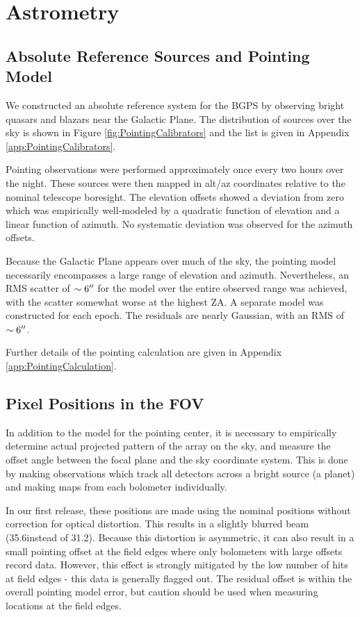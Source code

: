 \documentclass[12pt,preprint]{aastex}
\begin{document}
\section{Astrometry}
\label{sec:Astrometry}

\subsection{Absolute Reference Sources and Pointing Model}

We constructed an absolute reference system for the BGPS by observing
bright quasars and blazars near the Galactic Plane.  The distribution
of sources over the sky is shown in Figure
\ref{fig:PointingCalibrators} and the list is given in Appendix
\ref{app:PointingCalibrators}.

Pointing observations were performed approximately once every two
hours over the night.  These sources were then mapped in alt/az
coordinates relative to the nominal telescope boresight.  The
elevation offsets showed a deviation from zero which was empirically
well-modeled by a quadratic function of elevation and a linear
function of azimuth.  No systematic deviation was observed for the
azimuth offsets.  

Because the Galactic Plane appears over much of the sky, the pointing
model necessarily encompasses a large range of elevation and azimuth.
Nevertheless, an RMS scatter of $\sim 6\mbox{$^{\prime\prime}$}$ for the model over the
entire observed range was achieved, with the scatter somewhat worse at
the highest ZA.  A separate model was constructed for each epoch.  The
residuals are nearly Gaussian, with an RMS of $\sim6\mbox{$^{\prime\prime}$}$.  

Further details of the pointing calculation are given in Appendix
\ref{app:PointingCalculation}.

\subsection{Pixel Positions in the FOV}

In addition to the model for the pointing center, it is necessary to
empirically determine actual projected pattern of the array on the
sky, and measure the offset angle between the focal plane and the sky
coordinate system.  This is done by making observations which track
all detectors across a bright source (a planet) and making maps from each
bolometer individually. 

In our first release, these positions are made using the nominal positions
without correction for optical distortion.  This results in a slightly blurred
beam (35.6\farcs instead of 31.2\farcs).  Because this distortion is
asymmetric, it can also result in a small pointing offset at the field edges
where only bolometers with large offsets record data.  However, this effect is
strongly mitigated by the low number of hits at field edges - this data is
generally flagged out.  The residual offset is within the overall pointing
model error, but caution should be used when measuring locations at the field
edges.
\end{document}
